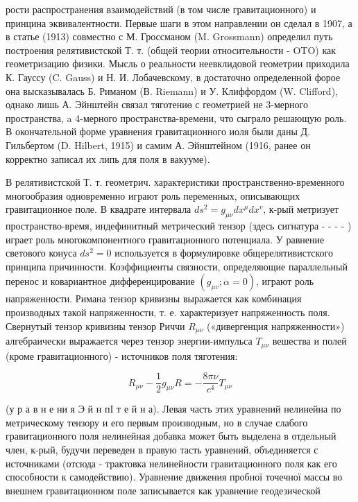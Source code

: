 \documentclass[10pt]{article}
\begin{document}
рости распространения взаимодействий (в том числе гравитационного) и принцина эквивалентности. Первые шаги в этом направлении он сделал в 1907, а в статье (1913) совместно с М. Гроссманом (M. Grossmann) определил путь построения релятивистской Т. т. (общей теории относительности - OTO) как геометризацию физики. Мысль о реальности неевклидовой геометрии приходила К. Гауссу (C. Gauss) и Н. И. Лобачевскому, в достаточно определенной форое она высказывалась Б. Риманом (В. Riemann) и У. Клиффордом (W. Clifford), однако лишь А. Эйнштейн связал тяготениө с геометрией не 3-мерного пространства, a 4-мерного пространства-времени, что сыграло решающую роль. В окончательной форме уравнения гравитационного иоля были даны Д. Гильбертом (D. Hilbert, 1915) и самим А. Эйнштейном (1916, ранее он корректно записал их липь для поля в вакууме).



В релятивистской Т. т. геометрич. характеристики пространственно-временного многообразия одновременно играют роль переменных, описывающих гравитационное поле. В квадрате интервала $d s^{2}=g_{\mu \nu} d x^{\mu} d x^{v}$, к-рый метризует пространство-время, индефинитный метрический тензор (здесь сигнатура - - - - ) играет роль многокомпонентного гравитационного потенциала. У равнение светового конуса $d s^{2}=0$ используется в формулировке общерелятивистского принципа причинности. Коэффициенты связности, определяющие параллельный перенос и ковариантное дифференцирование $\left(g_{\mu v} ; \alpha=0\right)$, играют роль напряженности. Римана тензор кривизны выражается как комбинация производных такой напряженности, т. е. характеризует напряженность поля. Свернутый тензор кривизны тензор Риччи $R_{\mu \nu}$ («дивергенция напряженности») алгебраически выражается через тензор энергии-импульса $T_{\mu \nu}$ вешества и полей (кроме гравитационного) - источников поля тяготения:



\[

R_{\mu \nu}-\frac{1}{2} g_{\mu \nu} R=-\frac{8 \pi \nu}{c^{4}} T_{\mu \nu}

\]



(у р а в н е ни я Э й н пI т е й н а). Левая часть этих уравнений нелинейна по метрическому тензору и его первым производным, но в случае слабого гравитационного поля нелинейная добавка может быть выделена в отдельный член, к-рый, будучи переведен в правую тасть уравнений, объединяется с источниками (отсюда - трактовка нелинейности гравитационного поля как его способности к самодействию). Уравнение движения пробної точечної массы во внешнем гравитационном поле записывается как уравнение геодезической
\end{document}
